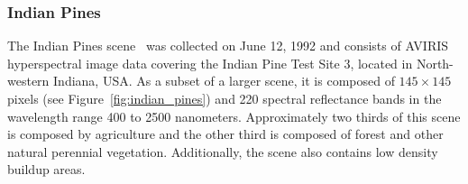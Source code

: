 \documentclass[remotesensing,article,submit,moreauthors,pdftex]{Definitions/mdpi}
\begin{document}
\begin{paracol}{2}
\subsubsection*{Indian Pines} 

The Indian Pines scene~\cite{Baumgardner2015} was collected on June 12, 1992
and consists of AVIRIS hyperspectral image data covering the Indian Pine Test
Site 3, located in North-western Indiana, USA. As a subset of a larger scene,
it is composed of $145 \times 145$ pixels (see Figure~\ref{fig:indian_pines})
and 220 spectral reflectance bands in the wavelength range 400 to 2500
nanometers. Approximately two thirds of
this scene is composed by agriculture and the other third is composed of
forest and other natural perennial vegetation. Additionally, the scene also
contains low density buildup areas.

\pagebreak
\end{paracol}
\end{document}
